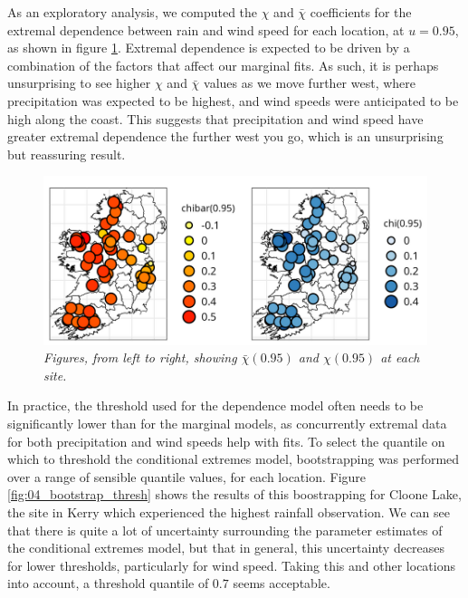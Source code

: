 \documentclass{article}
\numberwithin{equation}{section}
\begin{document}
As an exploratory analysis, we computed the $\chi$ and $\bar{\chi}$ coefficients for the extremal dependence between rain and wind speed for each location, at $u = 0.95$, as shown in figure \ref{fig:04_chi}.
Extremal dependence is expected to be driven by a combination of the factors that affect our marginal fits. 
As such, it is perhaps unsurprising to see higher $\chi$ and $\bar{\chi}$ values as we move further west, where precipitation was expected to be highest, and wind speeds were anticipated to be high along the coast. 
This suggests that precipitation and wind speed have greater extremal dependence the further west you go, which is an unsurprising but reassuring result.

\begin{figure}[H]
    \centering
    \includegraphics[width = 0.9\linewidth]{plots/041_chi_plots_crop.png}
    \caption{\emph{Figures, from left to right, showing $\bar{\chi}(0.95)$ and $\chi(0.95)$ at each site.}} 
    \label{fig:04_chi}
\end{figure}

In practice, the threshold used for the dependence model often needs to be significantly lower than for the marginal models, as concurrently extremal data for both precipitation and wind speeds help with fits. 
To select the quantile on which to threshold the conditional extremes model, bootstrapping was performed over a range of sensible quantile values, for each location. 
Figure \ref{fig:04_bootstrap_thresh} shows the results of this boostrapping for Cloone Lake, the site in Kerry which experienced the highest rainfall observation. 
We can see that there is quite a lot of uncertainty surrounding the parameter estimates of the conditional extremes model, but that in general, this uncertainty decreases for lower thresholds, particularly for wind speed. 
Taking this and other locations into account, a threshold quantile of $0.7$ seems acceptable.
\end{document}
